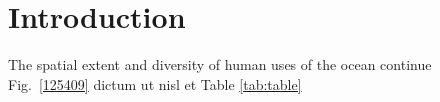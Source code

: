 \section{Introduction}
\label{introduction}

The spatial extent and diversity of human uses of the ocean continue  Fig.~\ref{125409} dictum ut nisl et Table \ref{tab:table}
